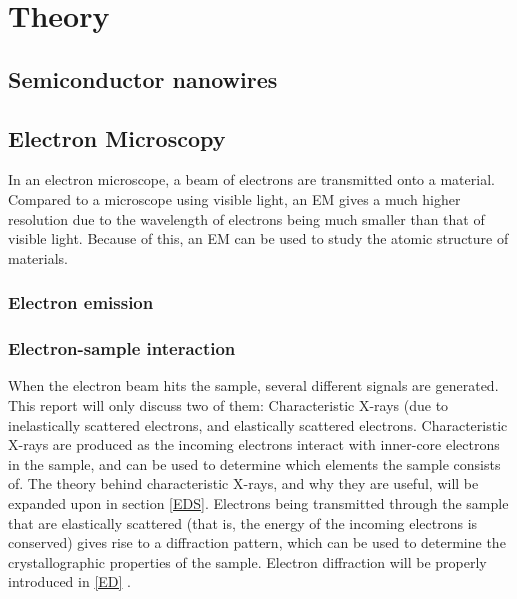 \chapter{Theory}

\section{Semiconductor nanowires}

\section{Electron Microscopy}
In an electron microscope, a beam of electrons are transmitted onto a material. Compared to a microscope using visible light, an EM gives a much higher resolution due to the wavelength of electrons being much smaller than that of visible light. Because of this, an EM can be used to study the atomic structure of materials.
	
	\subsection{Electron emission}

	\subsection{Electron-sample interaction}
When the electron beam hits the sample, several different signals are generated. This report will only discuss two of them: Characteristic X-rays (due to inelastically scattered electrons, and elastically scattered electrons. Characteristic X-rays are produced as the incoming electrons interact with inner-core electrons in the sample, and can be used to determine which elements the sample consists of. The theory behind characteristic X-rays, and why they are useful, will be expanded upon in section \ref{EDS}. Electrons being transmitted through the sample that are elastically scattered (that is, the energy of the incoming electrons is conserved) gives rise to a diffraction pattern, which can be used to determine the crystallographic properties of the sample. Electron diffraction will be properly introduced in \cref{ED} \cite{williams-carter}.

